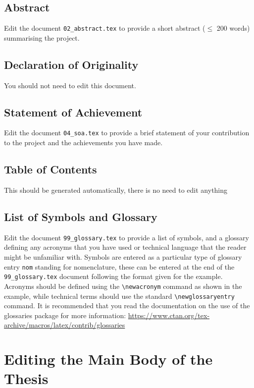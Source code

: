 \documentclass[a4paper,12pt]{article}
\begin{document}
\subsection{Abstract}

Edit the document \verb+02_abstract.tex+ to provide a short abstract ($\leq$
200 words) summarising the project.  

\subsection{Declaration of Originality}

You should not need to edit this document.

\subsection{Statement of Achievement}

Edit the document \verb+04_soa.tex+ to provide a brief statement of your
contribution to the project and the achievements you have made.

\subsection{Table of Contents}

This should be generated automatically, there is no need to edit anything

\subsection{List of Symbols and Glossary}

Edit the document \verb+99_glossary.tex+ to provide a list of symbols, and a
glossary defining any acronyms that you have used or technical language that
the reader might be unfamiliar with.  Symbols are entered as a particular type
of glossary entry \verb+nom+ standing for nomenclature, these can be entered at
the end of the \verb+99_glossary.tex+ document following the format given for
the example.  Acronyms should be defined using the \verb+\newacronym+ command
as shown in the example, while technical terms should use the standard
\verb+\newglossaryentry+ command.  It is recommended that you read the
documentation on the use of the glossaries package for more
information:\linebreak
\url{https://www.ctan.org/tex-archive/macros/latex/contrib/glossaries}

\section{Editing the Main Body of the Thesis}
\end{document}
